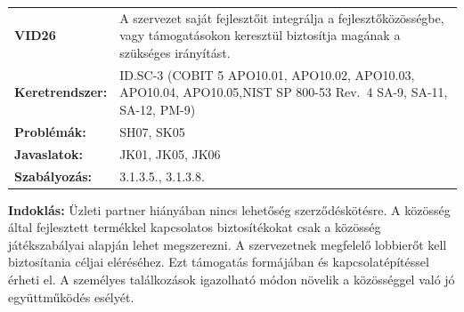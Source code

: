 \documentclass[12pt,magyar,a4paper,oneside]{scrreprt}
\begin{document}
\begin{longtable}[]{@{}ll@{}}
\toprule
\endhead
\begin{minipage}[t]{0.16\columnwidth}\raggedright
\textbf{VID26}\strut
\end{minipage} & \begin{minipage}[t]{0.79\columnwidth}\raggedright
A szervezet saját fejlesztőit integrálja a fejlesztőközösségbe, vagy
támogatásokon keresztül biztosítja magának a szükséges irányítást.\strut
\end{minipage}\tabularnewline
\begin{minipage}[t]{0.16\columnwidth}\raggedright
\textbf{Keretrendszer:}\strut
\end{minipage} & \begin{minipage}[t]{0.79\columnwidth}\raggedright
ID.SC-3 (COBIT 5 APO10.01, APO10.02, APO10.03, APO10.04, APO10.05,NIST
SP 800-53 Rev.~4 SA-9, SA-11, SA-12, PM-9)\strut
\end{minipage}\tabularnewline
\begin{minipage}[t]{0.16\columnwidth}\raggedright
\textbf{Problémák:}\strut
\end{minipage} & \begin{minipage}[t]{0.79\columnwidth}\raggedright
SH07, SK05\strut
\end{minipage}\tabularnewline
\begin{minipage}[t]{0.16\columnwidth}\raggedright
\textbf{Javaslatok:}\strut
\end{minipage} & \begin{minipage}[t]{0.79\columnwidth}\raggedright
JK01, JK05, JK06\strut
\end{minipage}\tabularnewline
\begin{minipage}[t]{0.16\columnwidth}\raggedright
\textbf{Szabályozás:}\strut
\end{minipage} & \begin{minipage}[t]{0.79\columnwidth}\raggedright
3.1.3.5., 3.1.3.8.\strut
\end{minipage}\tabularnewline
\bottomrule
\end{longtable}

\textbf{Indoklás: } Üzleti partner hiányában nincs lehetőség
szerződéskötésre. A közösség által fejlesztett termékkel kapcsolatos
biztosítékokat csak a közösség játékszabályai alapján lehet megszerezni.
A szervezetnek megfelelő lobbierőt kell biztosítania céljai eléréséhez.
Ezt támogatás formájában és kapcsolatépítéssel érheti el. A személyes
találkozások igazolható módon növelik a közösséggel való jó
együttműködés esélyét.
\end{document}
